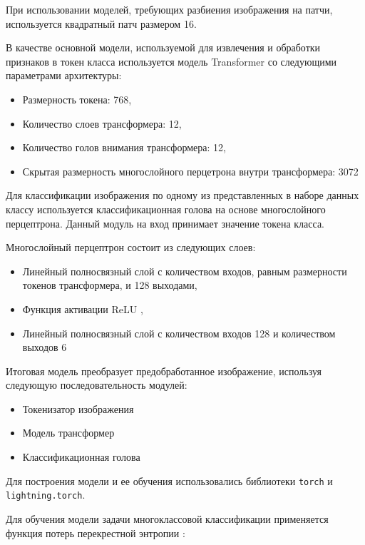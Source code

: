 При использовании моделей, требующих разбиения изображения на патчи, используется квадратный патч размером 16.

В качестве основной модели, используемой для извлечения и обработки признаков в токен класса используется модель Transformer со следующими параметрами архитектуры:

\begin{itemize}
    \item Размерность токена: 768,
    \item Количество слоев трансформера: 12,
    \item Количество голов внимания трансформера: 12,
    \item Скрытая размерность многослойного перцетрона внутри трансформера: 3072
\end{itemize}

Для классификации изображения по одному из представленных в наборе данных классу используется классификационная голова на основе многослойного перцептрона. Данный модуль на вход принимает значение токена класса. 

Многослойный перцептрон состоит из следующих слоев:

\begin{itemize}
    \item Линейный полносвязный слой с количеством входов, равным размерности токенов трансформера, и 128 выходами,
    \item Функция активации ReLU \cite{relu},
    \item Линейный полносвязный слой с количеством входов 128 и количеством выходов 6
\end{itemize}

Итоговая модель преобразует предобработанное изображение, используя следующую последовательность модулей:

\begin{itemize}
    \item Токенизатор изображения
    \item Модель трансформер
    \item Классификационная голова
\end{itemize}



Для построения модели и ее обучения использовались библиотеки  \texttt{torch} и \texttt{lightning.torch}.

Для обучения модели задачи многоклассовой классификации применяется функция потерь перекрестной энтропии \cite{goodfellow_dl}: 

